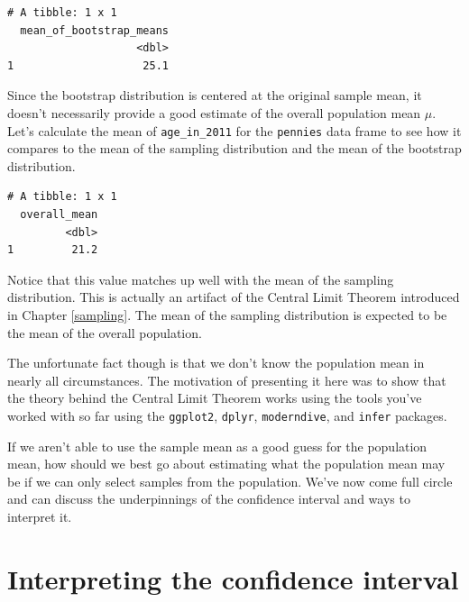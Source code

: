 \documentclass[12pt,]{krantz}
\makeatletter
\newenvironment{Shaded}{\begin{snugshade}}{\end{snugshade}}
\newcommand{\KeywordTok}[1]{\textcolor[rgb]{0.27,0.27,0.27}{\textbf{#1}}}
\newcommand{\DataTypeTok}[1]{\textcolor[rgb]{0.27,0.27,0.27}{#1}}
\newcommand{\DecValTok}[1]{\textcolor[rgb]{0.06,0.06,0.06}{#1}}
\newcommand{\StringTok}[1]{\textcolor[rgb]{0.5,0.5,0.5}{#1}}
\newcommand{\OperatorTok}[1]{\textcolor[rgb]{0.43,0.43,0.43}{\textbf{#1}}}
\newcommand{\NormalTok}[1]{#1}
\newenvironment{kframe}{%
\medskip{}
\setlength{\fboxsep}{.8em}
 \def\at@end@of@kframe{}%
 \ifinner\ifhmode%
  \def\at@end@of@kframe{\end{minipage}}%
  \begin{minipage}{\columnwidth}%
 \fi\fi%
 \def\FrameCommand##1{\hskip\@totalleftmargin \hskip-\fboxsep
 \colorbox{shadecolor}{##1}\hskip-\fboxsep
     \hskip-\linewidth \hskip-\@totalleftmargin \hskip\columnwidth}%
 \MakeFramed {\advance\hsize-\width
   \@totalleftmargin\z@ \linewidth\hsize
   \@setminipage}}%
 {\par\unskip\endMakeFramed%
 \at@end@of@kframe}
\renewenvironment{Shaded}{\begin{kframe}}{\end{kframe}}
\makeatother
\begin{document}
\begin{verbatim}
# A tibble: 1 x 1
  mean_of_bootstrap_means
                    <dbl>
1                    25.1
\end{verbatim}

Since the bootstrap distribution is centered at the original sample
mean, it doesn't necessarily provide a good estimate of the overall
population mean \(\mu\). Let's calculate the mean of
\texttt{age\_in\_2011} for the \texttt{pennies} data frame to see how it
compares to the mean of the sampling distribution and the mean of the
bootstrap distribution.

\begin{Shaded}
\end{Shaded}

\begin{verbatim}
# A tibble: 1 x 1
  overall_mean
         <dbl>
1         21.2
\end{verbatim}

Notice that this value matches up well with the mean of the sampling
distribution. This is actually an artifact of the Central Limit Theorem
introduced in Chapter \ref{sampling}. The mean of the sampling
distribution is expected to be the mean of the overall population.

The unfortunate fact though is that we don't know the population mean in
nearly all circumstances. The motivation of presenting it here was to
show that the theory behind the Central Limit Theorem works using the
tools you've worked with so far using the \texttt{ggplot2},
\texttt{dplyr}, \texttt{moderndive}, and \texttt{infer} packages.

If we aren't able to use the sample mean as a good guess for the
population mean, how should we best go about estimating what the
population mean may be if we can only select samples from the
population. We've now come full circle and can discuss the underpinnings
of the confidence interval and ways to interpret it.

\section{Interpreting the confidence
interval}\label{interpreting-the-confidence-interval}
\end{document}
